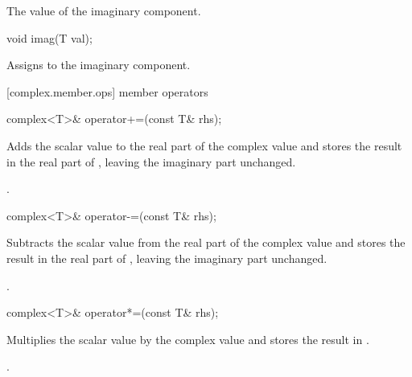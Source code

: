 \begin{itemdescr}
\returns The value of the imaginary component.
\end{itemdescr}

%
\begin{itemdecl}
void imag(T val);
\end{itemdecl}

\begin{itemdescr}
\effects Assigns  to the imaginary component.
\end{itemdescr}

[complex.member.ops]{ member operators}

%
\begin{itemdecl}
complex<T>& operator+=(const T& rhs);
\end{itemdecl}

\begin{itemdescr}
\pnum
\effects
Adds the scalar value  to the real part of the complex value
and stores the result in the real part of
,
leaving the imaginary part unchanged.

\pnum
\returns
{}.
\end{itemdescr}

%
\begin{itemdecl}
complex<T>& operator-=(const T& rhs);
\end{itemdecl}

\begin{itemdescr}
\pnum
\effects
Subtracts the scalar value  from the real part of the complex value
and stores the result in the real part of
,
leaving the imaginary part unchanged.

\pnum
\returns
{}.
\end{itemdescr}

%
\begin{itemdecl}
complex<T>& operator*=(const T& rhs);
\end{itemdecl}

\begin{itemdescr}
\pnum
\effects
Multiplies the scalar value  by the complex value
and stores the result in
.

\pnum
\returns
{}.
\end{itemdescr}

